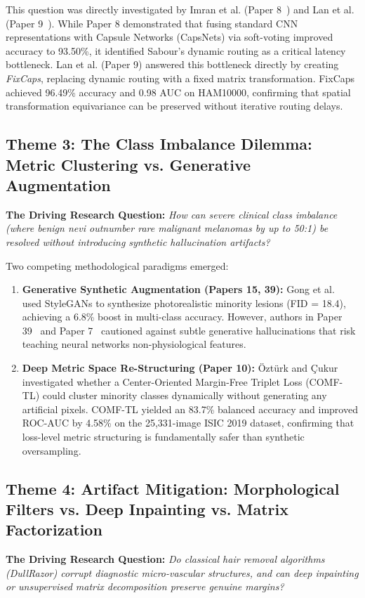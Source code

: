 This question was directly investigated by Imran et al. (Paper 8~\cite{9940917}) and Lan et al. (Paper 9~\cite{9791221}). While Paper 8 demonstrated that fusing standard CNN representations with Capsule Networks (CapsNets) via soft-voting improved accuracy to 93.50\%, it identified Sabour's dynamic routing as a critical latency bottleneck. Lan et al. (Paper 9) answered this bottleneck directly by creating \textit{FixCaps}, replacing dynamic routing with a fixed matrix transformation. FixCaps achieved 96.49\% accuracy and 0.98 AUC on HAM10000, confirming that spatial transformation equivariance can be preserved without iterative routing delays.

\subsection{Theme 3: The Class Imbalance Dilemma: Metric Clustering vs. Generative Augmentation}
\textbf{The Driving Research Question:} \textit{How can severe clinical class imbalance (where benign nevi outnumber rare malignant melanomas by up to 50:1) be resolved without introducing synthetic hallucination artifacts?}

Two competing methodological paradigms emerged:
\begin{enumerate}[leftmargin=*]
    \item \textbf{Generative Synthetic Augmentation (Papers 15, 39):} Gong et al.~\cite{9062473} used StyleGANs to synthesize photorealistic minority lesions (FID = 18.4), achieving a 6.8\% boost in multi-class accuracy. However, authors in Paper 39~\cite{11598907} and Paper 7~\cite{9113301} cautioned against subtle generative hallucinations that risk teaching neural networks non-physiological features.
    \item \textbf{Deep Metric Space Re-Structuring (Paper 10):} Öztürk and Çukur~\cite{9810181} investigated whether a Center-Oriented Margin-Free Triplet Loss (COMF-TL) could cluster minority classes dynamically without generating any artificial pixels. COMF-TL yielded an 83.7\% balanced accuracy and improved ROC-AUC by 4.58\% on the 25,331-image ISIC 2019 dataset, confirming that loss-level metric structuring is fundamentally safer than synthetic oversampling.
\end{enumerate}

\subsection{Theme 4: Artifact Mitigation: Morphological Filters vs. Deep Inpainting vs. Matrix Factorization}
\textbf{The Driving Research Question:} \textit{Do classical hair removal algorithms (DullRazor) corrupt diagnostic micro-vascular structures, and can deep inpainting or unsupervised matrix decomposition preserve genuine margins?}

